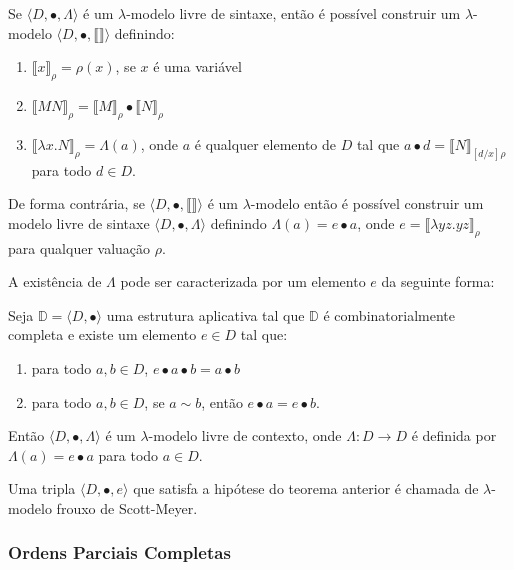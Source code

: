 \documentclass[../main.tex]{subfiles}
\begin{document}
\begin{theorem}
    Se $\langle D, \bullet, \Lambda \rangle$ é um $\lambda$-modelo livre de sintaxe, então é possível construir um $\lambda$-modelo $\langle D, \bullet, \llbracket \rrbracket \rangle$ definindo:
    \begin{enumerate}
        \item $\llbracket x \rrbracket_{\rho} = \rho(x)$, se $x$ é uma variável
        \item $\llbracket MN \rrbracket_{\rho} = \llbracket M \rrbracket_{\rho} \bullet \llbracket N \rrbracket_{\rho} $
        \item $\llbracket \lambda x . N \rrbracket_{\rho} = \Lambda(a)$, onde $a$ é qualquer elemento de $D$ tal que $a \bullet d = \llbracket N \rrbracket_{[d/x]\rho}$ para todo $d \in D$.
    \end{enumerate}
    De forma contrária, se $\langle D, \bullet, \llbracket \rrbracket \rangle$ é um $\lambda$-modelo então é possível construir um modelo livre de sintaxe $\langle D, \bullet, \Lambda \rangle$ definindo $\Lambda(a) = e \bullet a$, onde $e = \llbracket \lambda yz . yz \rrbracket_{\rho}$ para qualquer valuação $\rho$.
\end{theorem}

A existência de $\Lambda$ pode ser caracterizada por um elemento $e$ da seguinte forma:

\begin{theorem}
    Seja $\mathbb{D} = \langle D, \bullet \rangle$ uma estrutura aplicativa tal que $\mathbb{D}$ é combinatorialmente completa e existe um elemento $e \in D$ tal que:
    \begin{enumerate}
        \item para todo $a, b \in D$, $e \bullet a \bullet b = a \bullet b$
        \item para todo $a, b \in D$, se $a \sim b$, então $e \bullet a = e \bullet b$.
    \end{enumerate}
    Então $\langle D, \bullet, \Lambda \rangle$ é um $\lambda$-modelo livre de contexto, onde $\Lambda : D \to D$ é definida por $\Lambda(a) = e \bullet a$ para todo $a \in D$.
\end{theorem}

Uma tripla $\langle D, \bullet, e \rangle$ que satisfa a hipótese do teorema anterior é chamada de $\lambda$-modelo frouxo de Scott-Meyer.

\subsubsection{Ordens Parciais Completas}
\end{document}
